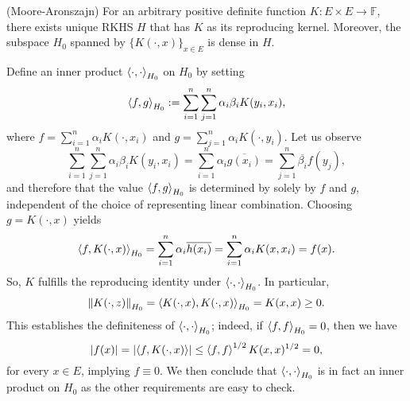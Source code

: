\documentclass[a4paper,12pt]{article}
\begin{document}

\begin{thm} (Moore-Aronszajn)\label{Moore Theorem}
	For an arbitrary positive definite function \( K:E \times E \to \mathbb{F} \), there exists unique RKHS \( H \) that has \( K \) as its reproducing kernel. Moreover, the subspace \( H_0 \) spanned by \( \{K(\cdot ,x)\}_{x \in E} \) is dense in \( H \).
\end{thm}
\begin{prf}
	Define an inner product \( \left<\cdot, \cdot  \right>_{H_0} \) on \( H_0 \) by setting
	\begin{equation*}
		\left<f, g \right>_{H_0} := \sum_{i=1}^{n} \sum_{j=1}^{n} \alpha_i \beta_i K(y_i,x_i),
	\end{equation*}
	where \( f= \sum_{i=1}^{n} \alpha_i K(\cdot ,x_i) \) and \( g= \sum_{j=1}^{n} \alpha_i K(\cdot ,y_i) \). Let us observe
	\begin{equation*}
		\sum_{i=1}^{n} \sum_{j=1}^{n} \alpha_i \beta_i K(y_i,x_i)
		= \sum_{i=1}^{n}\alpha_i \overline{g(x_i)} = \sum_{j=1}^{n} \overline{\beta_i}f(y_j),
	\end{equation*}
	and therefore that the value \( \left<f, g \right>_{H_0} \) is determined by solely by \( f \) and \( g \), independent of the choice of representing linear combination. Choosing \( g=K(\cdot ,x) \) yields
	\begin{equation*}
		\left<f, K(\cdot ,x) \right>_{H_0} = \sum_{i=1}^{n} \alpha_i \overline{h(x_i)}
		= \sum_{i=1}^{n} \alpha_i K(x,x_i) = f(x).
	\end{equation*}
	So, \( K \) fulfills the reproducing identity under \( \left<\cdot , \cdot  \right>_{H_0} \). In particular,
	\begin{equation*}
		\left\| K(\cdot ,z) \right\|_{H_0} = \left<K(\cdot ,x), K(\cdot ,x) \right>_{H_0} = K(x,x) \ge 0.
	\end{equation*}
	This establishes the definiteness of \( \left<\cdot , \cdot  \right>_{H_0} \); indeed, if \( \left<f, f \right>_{H_0} = 0 \), then we have
	\begin{equation*}
		\left| f(x) \right| = \left| \left<f, K(\cdot ,x) \right> \right| \le \left<f, f \right>^{1/2}K(x,x)^{1/2}=0,
	\end{equation*}
	for every \( x \in E \), implying \( f \equiv 0 \). We then conclude that \( \left<\cdot , \cdot  \right>_{H_0} \) is in fact an inner product on \( H_0 \) as the other requirements are easy to check.
	

\end{prf}
\end{document}
